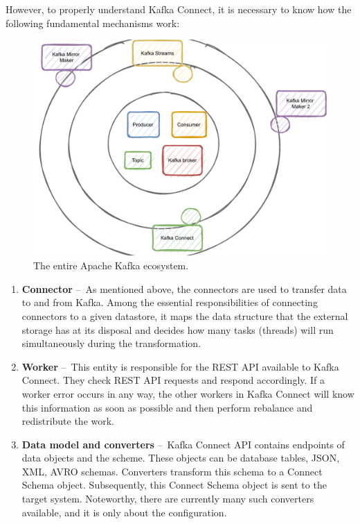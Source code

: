 However, to properly understand Kafka Connect, it is necessary to know how the following fundamental mechanisms work:

\begin{figure}[!ht]
    \centering
    \includegraphics[scale=0.8]{obrazky-figures/02-preliminaries/02-kafka/12-all-in-one.pdf}
    \caption{The entire Apache Kafka ecosystem.}
    \label{fig:02-ecosystem-of-kafka}
\end{figure}

\begin{enumerate}
    \item \textbf{Connector} \---\ As mentioned above, the connectors are used to transfer data to and from Kafka. Among the essential responsibilities of connecting connectors to a given datastore, it maps the data structure that the external storage has at its disposal and decides how many tasks (threads) will run simultaneously during the transformation.
    \item \textbf{Worker} \---\ This entity is responsible for the REST API available to Kafka Connect. They check REST API requests and respond accordingly. If a worker error occurs in any way, the other workers in Kafka Connect will know this information as soon as possible and then perform rebalance and redistribute the work.
    \item \textbf{Data model and converters} \---\ Kafka Connect API contains endpoints of data objects and the scheme. These objects can be database tables, JSON, XML, AVRO schemas. Converters transform this schema to a Connect Schema object. Subsequently, this Connect Schema object is sent to the target system. Noteworthy, there are currently many such converters available, and it is only about the configuration. 
\end{enumerate}

